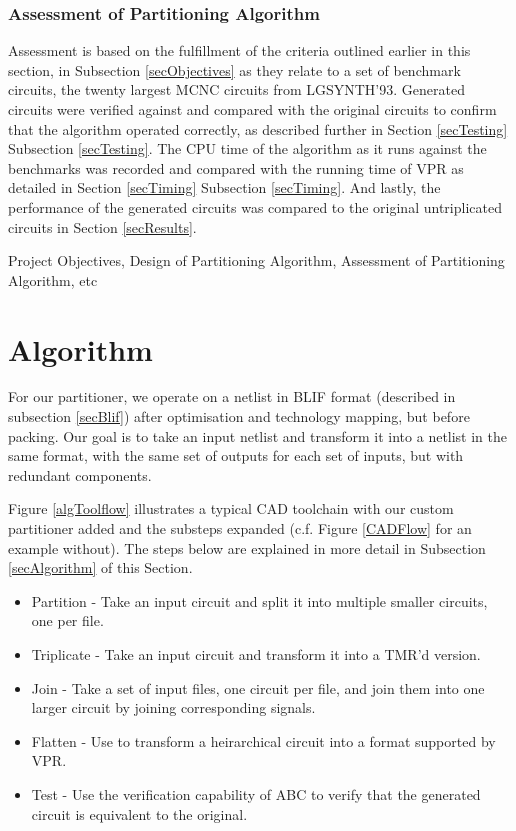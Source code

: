 \documentclass[12pt,final,oneside]{dwThesis} %
\begin{document}
	\subsection{Assessment of Partitioning Algorithm}
		Assessment is based on the fulfillment of the criteria outlined earlier in this section, in Subsection \ref{secObjectives} as they relate to a set of benchmark circuits, the twenty largest MCNC circuits from LGSYNTH'93.
		Generated circuits were verified against and compared with the original circuits to confirm that the algorithm operated correctly, as described further in Section \ref{secTesting} Subsection \ref{secTesting}.
		The \gls{CPU} time of the algorithm as it runs against the benchmarks was recorded and compared with the running time of \gls{VPR} as detailed in Section \ref{secTiming} Subsection \ref{secTiming}. 
		And lastly, the performance of the generated circuits was compared to the original untriplicated circuits in Section \ref{secResults}.

 Project Objectives, Design of Partitioning Algorithm, Assessment of Partitioning Algorithm, etc


   \chapter{Algorithm}
   For our partitioner, we operate on a netlist in \gls{BLIF} format (described in subsection \ref{secBlif}) after optimisation and technology mapping, but before packing. Our goal is to take an input netlist and transform it into a netlist in the same format, with the same set of outputs for each set of inputs, but with redundant components.


   Figure \ref{algToolflow} illustrates a typical \gls{CAD} toolchain with our custom partitioner added and the substeps expanded (c.f. Figure \ref{CADFlow} for an example without). The steps below are explained in more detail in Subsection \ref{secAlgorithm} of this Section.
   \begin{itemize}
      \item Partition - Take an input circuit and split it into multiple smaller circuits, one per file.
      \item Triplicate - Take an input circuit and transform it into a TMR'd version.
      \item Join - Take a set of input files, one circuit per file, and join them into one larger circuit by joining corresponding signals.
      \item Flatten - Use  to transform a heirarchical circuit into a format supported by VPR.
      \item Test - Use the verification capability of \gls{ABC} to verify that the generated circuit is equivalent to the original.
   \end{itemize}
   
\end{document}
